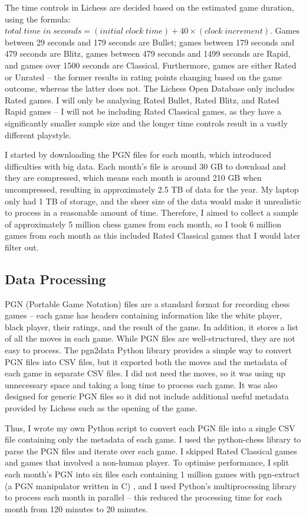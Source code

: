 \documentclass[a4paper, 11pt]{article}
\begin{document}
The time controls in Lichess are decided based on the estimated game duration, using the formula: $total \; time \; in \; seconds = (initial \; clock \; time) + 40 \times (clock \; increment)$. Games between 29 seconds and 179 seconds are Bullet; games between 179 seconds and 479 seconds are Blitz, games between 479 seconds and 1499 seconds are Rapid, and games over 1500 seconds are Classical. Furthermore, games are either Rated or Unrated -- the former results in rating points changing based on the game outcome, whereas the latter does not. The Lichess Open Database only includes Rated games. I will only be analysing Rated Bullet, Rated Blitz, and Rated Rapid games -- I will not be including Rated Classical games, as they have a significantly smaller sample size and the longer time controls result in a vastly different playstyle.

I started by downloading the PGN files for each month, which introduced difficulties with big data. Each month's file is around 30 GB to download and they are compressed, which means each month is around 210 GB when uncompressed, resulting in approximately 2.5 TB of data for the year. My laptop only had 1 TB of storage, and the sheer size of the data would make it unrealistic to process in a reasonable amount of time. Therefore, I aimed to collect a sample of approximately 5 million chess games from each month, so I took 6 million games from each month as this included Rated Classical games that I would later filter out.

\subsection{Data Processing}
PGN (Portable Game Notation) files are a standard format for recording chess games -- each game has headers containing information like the white player, black player, their ratings, and the result of the game. In addition, it stores a list of all the moves in each game. While PGN files are well-structured, they are not easy to process. The pgn2data Python library \cite{pgn2dataGitHub} provides a simple way to convert PGN files into CSV files, but it exported both the moves and the metadata of each game in separate CSV files. I did not need the moves, so it was using up unnecessary space and taking a long time to process each game. It was also designed for generic PGN files so it did not include additional useful metadata provided by Lichess such as the opening of the game.

Thus, I wrote my own Python script to convert each PGN file into a single CSV file containing only the metadata of each game. I used the python-chess library to parse the PGN files and iterate over each game. I skipped Rated Classical games and games that involved a non-human player. To optimise performance, I split each month's PGN into six files each containing 1 million games with pgn-extract (a PGN manipulator written in C) \cite{pgnExtractGitHub}, and I used Python's multiprocessing library to process each month in parallel -- this reduced the processing time for each month from 120 minutes to 20 minutes.
\end{document}
